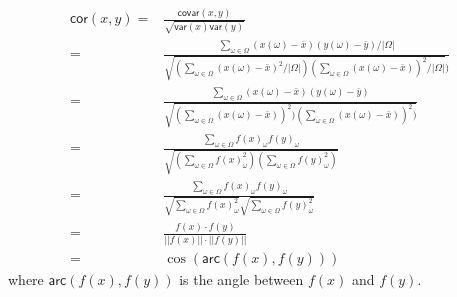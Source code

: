 \begin{solution}
$$\begin{aligned}
\textsf{cor}(x,y) =& \frac{\mathsf{covar}(x,y)}{\sqrt{\mathsf{var}(x)\mathsf{var}(y)}}\\
= & \frac{\sum_{\omega \in \Omega} (x(\omega) - \bar{x}) (y(\omega) - \bar{y})/|\Omega|}{\sqrt{(\sum_{\omega \in \Omega} (x(\omega) - \bar{x})^2/|\Omega|)(\sum_{\omega \in \Omega} (x(\omega) - \bar{x}))^2/|\Omega|})} \\
= & \frac{\sum_{\omega \in \Omega} (x(\omega) - \bar{x}) (y(\omega) - \bar{y})}{\sqrt{(\sum_{\omega \in \Omega} (x(\omega) - \bar{x}))^2)(\sum_{\omega \in \Omega} (x(\omega) - \bar{x}))^2)}} \\
= & \frac{\sum_{\omega \in \Omega} f(x)_{\omega} f(y)_{\omega}}{\sqrt{(\sum_{\omega \in \Omega} f(x)_{\omega}^2)(\sum_{\omega \in \Omega} f(y)_{\omega}^2)}} \\
= & \frac{\sum_{\omega \in \Omega} f(x)_{\omega} f(y)_{\omega}}{\sqrt{\sum_{\omega \in \Omega} f(x)_{\omega}^2}\sqrt{\sum_{\omega \in \Omega} f(y)_{\omega}^2}} \\
= &  \frac{f(x)\cdot f(y)}{||f(x)|| \cdot ||f(y)||} \\
= & \cos(\textsf{arc}(f(x), f(y)))
\end{aligned} $$
where $\textsf{arc}(f(x), f(y))$ is the angle between $f(x)$ and $f(y)$.
\end{solution}
